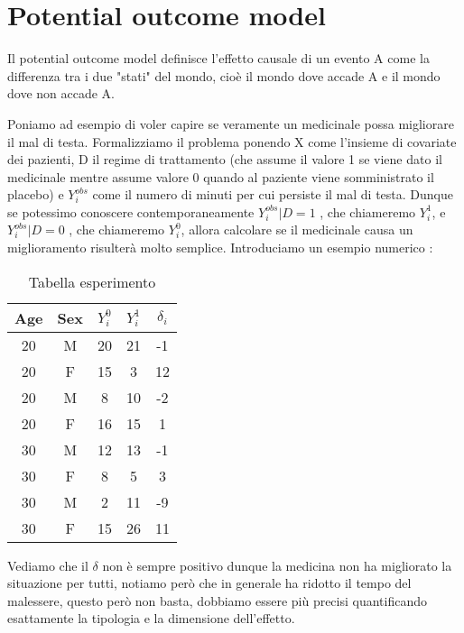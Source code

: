 \chapter{Potential outcome model}
\label{chapt:PotentialOM}

Il potential outcome model definisce l'effetto causale di un evento A come la differenza tra i due "stati" del mondo, cioè il mondo dove accade A e il mondo dove non accade A.

Poniamo ad esempio di voler capire se veramente un medicinale possa migliorare il mal di testa. Formalizziamo il problema ponendo X come l'insieme di covariate dei pazienti, D il regime di trattamento (che assume il valore 1 se viene dato il medicinale mentre assume valore 0 quando al paziente viene somministrato il placebo) e $Y^{obs}_i$ come il numero di minuti per cui persiste il mal di testa. 
Dunque se potessimo conoscere contemporaneamente  $Y^{obs}_i|D=1$ , che chiameremo $Y^{1}_i$, e $Y^{obs}_i|D=0$ , che chiameremo $Y^{0}_i$, allora calcolare se il medicinale causa un miglioramento risulterà molto semplice. Introduciamo un esempio numerico : 
\begin{table}[H]
\centering
\begin{tabular}{|c|c|c|c|c|}
\hline
Age & Sex & $Y^{0}_i$ & $Y^{1}_i$ & $\delta_i$ \\ \hline
20 & M & 20 & 21 & -1  \\ \hline
20 & F & 15 & 3 & 12 \\ \hline
20 & M & 8 & 10 & -2 \\ \hline
20 & F & 16 & 15 & 1 \\ \hline
30 & M & 12 & 13 & -1 \\ \hline
30 & F & 8 & 5 & 3 \\ \hline
30 & M & 2 & 11 & -9  \\ \hline
30 & F & 15 & 26 & 11 \\ \hline
\end{tabular}
\caption{Tabella esperimento }
\end{table}
Vediamo che il $\delta$ non è sempre positivo dunque la medicina non ha migliorato la situazione per tutti, notiamo però che in generale ha ridotto il tempo del malessere, questo però non basta, dobbiamo essere più precisi quantificando esattamente la tipologia e la dimensione dell'effetto.

